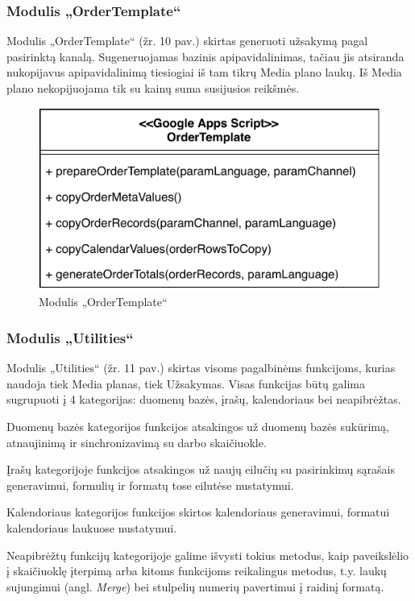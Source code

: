 \subsubsection{Modulis „OrderTemplate“}
Modulis „OrderTemplate“ (žr. 10 pav.) skirtas generuoti užsakymą pagal pasirinktą kanalą. Sugeneruojamas bazinis apipavidalinimas, tačiau jis atsiranda nukopijavus apipavidalinimą tiesiogiai iš tam tikrų Media plano laukų. Iš Media plano nekopijuojama tik su kainų suma susijusios reikšmės.

\begin{figure}[H]
    \centering
    \includegraphics[scale=0.7]{Images/module-order-template.pdf}
    \caption{Modulis „OrderTemplate“}
    \label{img:model}
\end{figure}

\subsubsection{Modulis „Utilities“}
Modulis „Utilities“ (žr. 11 pav.) skirtas visoms pagalbinėms funkcijoms, kurias naudoja tiek Media planas, tiek Užsakymas. Visas funkcijas būtų galima sugrupuoti į 4 kategorijas: duomenų bazės, įrašų, kalendoriaus bei neapibrėžtas. 

Duomenų bazės kategorijos funkcijos atsakingos už duomenų bazės sukūrimą, atnaujinimą ir sinchronizavimą su darbo skaičiuokle. 

Įrašų kategorijoje funkcijos atsakingos už naujų eilučių su pasirinkimų sąrašais generavimui, formulių ir formatų tose eilutėse nustatymui.

Kalendoriaus kategorijos funkcijos skirtos kalendoriaus generavimui, formatui kalendoriaus laukuose nustatymui.

Neapibrėžtų funkcijų kategorijoje galime išvysti tokius metodus, kaip paveikslėlio į skaičiuoklę įterpimą arba kitoms funkcijoms reikalingus metodus, t.y. laukų sujungimui (angl. \textit{Merge}) bei stulpelių numerių pavertimui į raidinį formatą.

